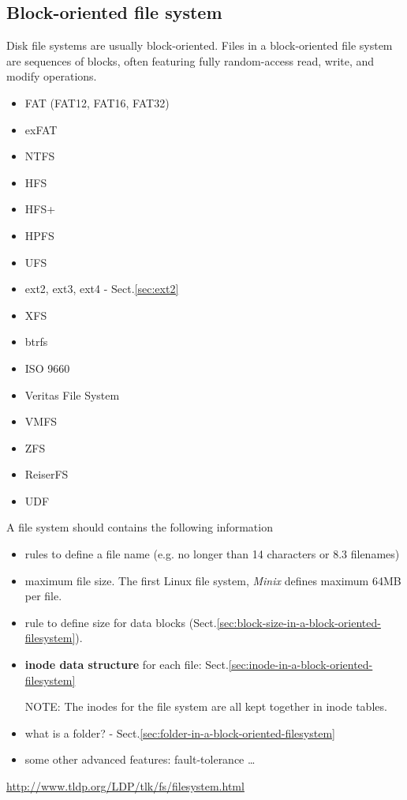 \subsection{Block-oriented file system}
\label{sec:filesystem_block-oriented}

Disk file systems are usually block-oriented. Files in a block-oriented file
system are sequences of blocks, often featuring fully random-access read, write,
and modify operations. 

\begin{itemize}
  \item FAT (FAT12, FAT16, FAT32)
  \item exFAT
  \item NTFS
  \item HFS
  \item HFS+
  \item HPFS
  \item UFS
  \item ext2, ext3, ext4 - Sect.\ref{sec:ext2}
  \item XFS
  \item btrfs
  \item ISO 9660
  \item Veritas File System
  \item VMFS
  \item ZFS
  \item ReiserFS
  \item UDF
\end{itemize}

A file system should contains the following information
\begin{itemize}
  \item rules to define a file name (e.g. no longer than 14 characters or 8.3
  filenames)
  
  \item maximum file size. The first Linux file system, {\it Minix} defines
  maximum 64MB per file.
  
  \item rule to define size for data blocks
  (Sect.\ref{sec:block-size-in-a-block-oriented-filesystem}). 
  
  \item {\bf inode data structure} for each file: Sect.\ref{sec:inode-in-a-block-oriented-filesystem}
    
NOTE: The inodes for the file system are all kept together in inode tables.
  
  \item what is a folder? -
  Sect.\ref{sec:folder-in-a-block-oriented-filesystem}
    
  \item some other advanced features: fault-tolerance \ldots
\end{itemize}
\url{http://www.tldp.org/LDP/tlk/fs/filesystem.html}


